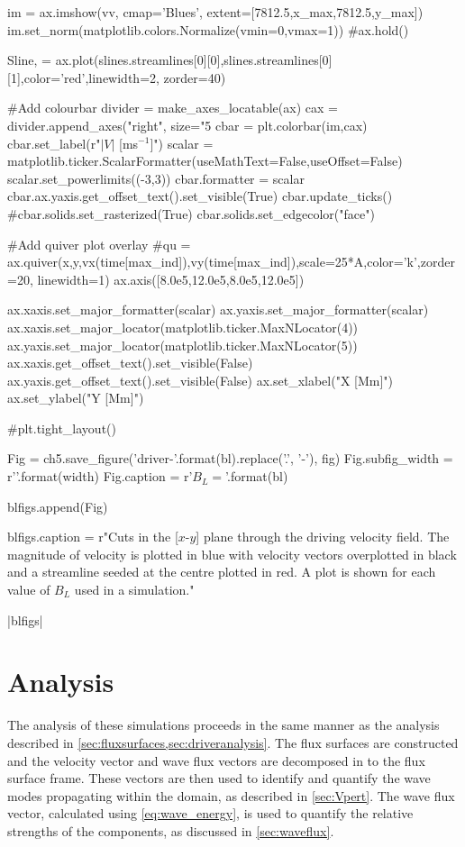 \begin{pycode}[chapter5]
    im = ax.imshow(vv, cmap='Blues', extent=[7812.5,x_max,7812.5,y_max])
    im.set_norm(matplotlib.colors.Normalize(vmin=0,vmax=1))
    #ax.hold()
    
    Sline, = ax.plot(slines.streamlines[0][0],slines.streamlines[0][1],color='red',linewidth=2, zorder=40)
    
    #Add colourbar
    divider = make_axes_locatable(ax)
    cax = divider.append_axes("right", size="5%
    cbar = plt.colorbar(im,cax)
    cbar.set_label(r"$|V|$ [ms$^{-1}$]")
    scalar = matplotlib.ticker.ScalarFormatter(useMathText=False,useOffset=False)
    scalar.set_powerlimits((-3,3))
    cbar.formatter = scalar
    cbar.ax.yaxis.get_offset_text().set_visible(True)
    cbar.update_ticks()
    #cbar.solids.set_rasterized(True)
    cbar.solids.set_edgecolor("face")
    
    #Add quiver plot overlay
    #qu = ax.quiver(x,y,vx(time[max_ind]),vy(time[max_ind]),scale=25*A,color='k',zorder=20, linewidth=1)
    ax.axis([8.0e5,12.0e5,8.0e5,12.0e5])
    
    ax.xaxis.set_major_formatter(scalar)
    ax.yaxis.set_major_formatter(scalar)
    ax.xaxis.set_major_locator(matplotlib.ticker.MaxNLocator(4))
    ax.yaxis.set_major_locator(matplotlib.ticker.MaxNLocator(5))
    ax.xaxis.get_offset_text().set_visible(False)
    ax.yaxis.get_offset_text().set_visible(False)
    ax.set_xlabel("X [Mm]")
    ax.set_ylabel("Y [Mm]")
    
    #plt.tight_layout()
    
    Fig = ch5.save_figure('driver-{}'.format(bl).replace('.', '-'), fig)
    Fig.subfig_width = r'{}\columnwidth'.format(width)
    Fig.caption = r'$B_L = {}$'.format(bl)
    
    blfigs.append(Fig)
   
blfigs.caption = r"Cuts in the [$x$-$y$] plane through the driving velocity field. The magnitude of velocity is plotted in blue with velocity vectors overplotted in black and a streamline seeded at the centre plotted in red. A plot is shown for each value of $B_L$ used in a simulation."

\end{pycode}

\py[chapter5]|blfigs|

\section{Analysis}\label{sec:analysis}

The analysis of these simulations proceeds in the same manner as the analysis described in \cref{sec:fluxsurfaces,sec:driveranalysis}.
The flux surfaces are constructed and the velocity vector and wave flux vectors are decomposed in to the flux surface frame.
These vectors are then used to identify and quantify the wave modes propagating within the domain, as described in \cref{sec:Vpert}.
The wave flux vector, calculated using \cref{eq:wave_energy}, is used to quantify the relative strengths of the components, as discussed in \cref{sec:waveflux}.

